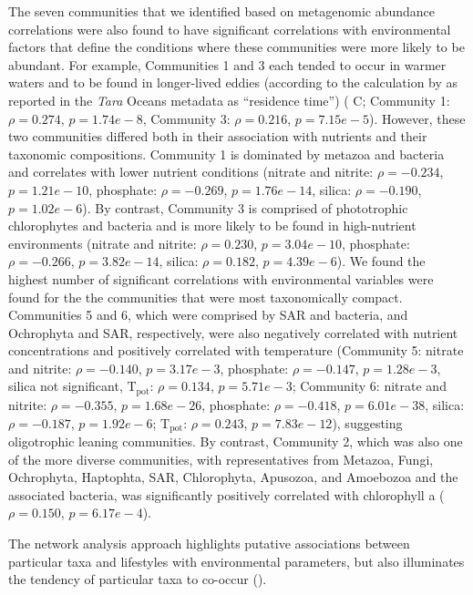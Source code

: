 \documentclass[12pt]{article}
\numberwithin{equation}{section}
\begin{document}
The seven communities that we identified based on metagenomic abundance correlations were also found to have significant correlations with environmental factors that define the conditions where these communities were more likely to be abundant. For example, Communities 1 and 3 each tended to occur in warmer waters and to be found in longer-lived eddies (according to the calculation by \cite{d2010fluid} as reported in the \textit{Tara} Oceans metadata \cite{taraoceansconsortium2014ross} as ``residence time'') ( C; Community 1: $\rho=0.274$, $p=1.74e-8$, Community 3: $\rho=0.216$, $p=7.15e-5$). However, these two communities differed both in their association with nutrients and their taxonomic compositions. Community 1 is dominated by metazoa and bacteria and correlates with lower nutrient conditions (nitrate and nitrite: $\rho=-0.234$, $p=1.21e-10$, phosphate: $\rho=-0.269$, $p=1.76e-14$, silica: $\rho=-0.190$, $p=1.02e-6$). By contrast, Community 3 is comprised of phototrophic chlorophytes and bacteria and is more likely to be found in high-nutrient environments (nitrate and nitrite: $\rho=0.230$, $p=3.04e-10$, phosphate: $\rho=-0.266$, $p=3.82e-14$, silica: $\rho=0.182$, $p=4.39e-6$). We found the highest number of significant correlations with environmental variables were found for the the communities that were most taxonomically compact. Communities 5 and 6, which were comprised by SAR and bacteria, and Ochrophyta and SAR, respectively, were also negatively correlated with nutrient concentrations and positively correlated with temperature (Community 5: nitrate and nitrite: $\rho=-0.140$, $p=3.17e-3$, phosphate: $\rho=-0.147$, $p=1.28e-3$, silica not significant, T$_\textrm{pot}$: $\rho=0.134$, $p=5.71e-3$; Community 6: nitrate and nitrite: $\rho=-0.355$, $p=1.68e-26$, phosphate: $\rho=-0.418$, $p=6.01e-38$, silica: $\rho=-0.187$, $p=1.92e-6$; T$_\textrm{pot}$: $\rho=0.243$, $p=7.83e-12$), suggesting oligotrophic leaning communities. By contrast, Community 2, which was also one of the more diverse communities, with representatives from Metazoa, Fungi, Ochrophyta, Haptophta, SAR, Chlorophyta, Apusozoa, and Amoebozoa and the associated bacteria, was significantly positively correlated  with chlorophyll a ($\rho=0.150$, $p=6.17e-4$). 

The network analysis approach highlights putative associations between particular taxa and lifestyles with environmental parameters, but also illuminates the tendency of particular taxa to co-occur (). 
\end{document}
